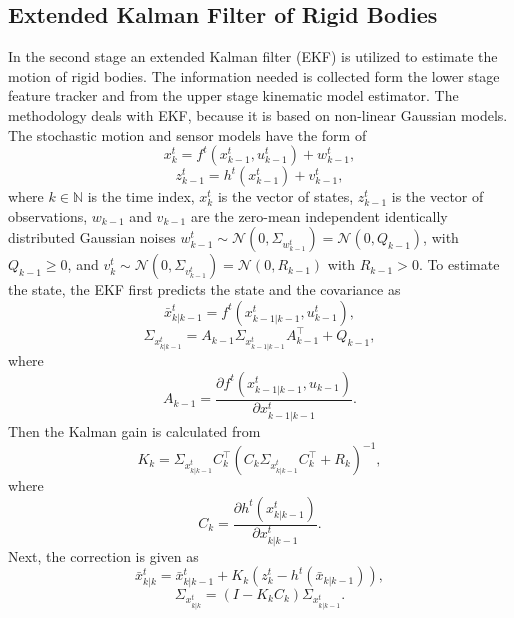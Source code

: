 \documentclass[letterpaper, 10 pt, conference]{ieeeconf}
\begin{document}
\subsection{Extended Kalman Filter of Rigid Bodies}\label{EKFrb}
In the second stage an extended Kalman filter (EKF) is utilized to estimate the motion of rigid bodies. The information needed is collected form the lower stage feature tracker and from the upper stage kinematic model estimator. The methodology deals with EKF, because it is based on non-linear Gaussian models. The stochastic motion and sensor models have the form of
\begin{equation}
x_k^t=f^t(x_{k-1}^t,u_{k-1}^t)+w_{k-1}^t,
\end{equation} 
\begin{equation}\label{obsM}
z_{k-1}^t=h^t(x_{k-1}^t)+v_{k-1}^t,
\end{equation} 
where $k \in \mathbb{N}$ is the time index, $x_k^t$ is the vector of states, $z_{k-1}^t$ is the vector of observations, $w_{k-1}$ and $v_{k-1}$ are the zero-mean independent identically distributed Gaussian noises $w_{k-1}^t \sim \mathcal{N}(0, \Sigma_{w_{k-1}^t})=\mathcal{N}(0, Q_{k-1})$, with $Q_{k-1} \geq 0$, and $v_{k}^t \sim \mathcal{N}(0, \Sigma_{v_{k-1}^t})=\mathcal{N}(0, R_{k-1})$ with $R_{k-1}>0$.
To estimate the state, the EKF first predicts the state and the covariance as
\begin{equation}
\bar{x}_{k|k-1}^t=f^t(x^t_{k-1|k-1},u^t_{k-1}),
\end{equation}
\begin{equation}
\Sigma_{x_{k|k-1}^t}=A_{k-1} \Sigma_{x_{k-1|k-1}^t} A_{k-1}^{\intercal} +Q_{k-1},
\end{equation}
where
\begin{equation}
A_{k-1}= \frac{\partial f^t(x_{k-1|k-1}^t,u_{k-1})}{\partial x_{k-1|k-1}^t}.
\end{equation}
Then the Kalman gain is calculated from 
\begin{equation}
K_{k}= \Sigma_{x_{k|k-1}^t} C_k^{\intercal}(C_k \Sigma_{x_{k|k-1}^t} C_k^{\intercal}+ R_{k})^{-1},
\end{equation}
where
\begin{equation}
C_k= \frac{\partial h^t(x_{k|k-1}^t)}{\partial x^t_{k|k-1}}.
\end{equation}
Next, the correction is given as
\begin{equation}
\bar{x}_{k|k}^t=\bar{x}_{k|k-1}^t+K_k(z_k^t-h^t(\bar{x}_{k|k-1})),
\end{equation}
\begin{equation}
\Sigma_{x_{k|k}^t}=(I-K_kC_k)\Sigma_{x_{k|k-1}^t}.
\end{equation}
\end{document}
